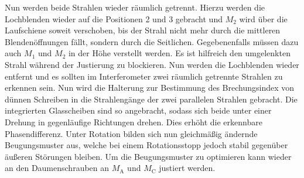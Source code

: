   Nun werden beide Strahlen wieder räumlich getrennt.
  Hierzu werden die Lochblenden wieder auf die Positionen 2 und 3 gebracht und $M_\text{2}$ wird über die Laufschiene soweit verschoben, bis der Strahl nicht mehr durch die mittleren Blendenöffnungen fällt, sondern durch die Seitlichen. Gegebenenfalls müssen dazu auch $M_\text{1}$ und $M_\text{2}$ in der Höhe verstellt werden. Es ist hilfreich den umgelenkten Strahl während der Justierung zu blockieren.
Nun werden die Lochblenden wieder entfernt und es sollten im Interferometer zwei räumlich getrennte Strahlen zu erkennen sein.
Nun wird die Halterung zur Bestimmung des Brechungsindex von dünnen Schreiben in die Strahlengänge der zwei parallelen Strahlen gebracht. Die integrierten Glasscheiben sind so angebracht, sodass sich beide unter einer Drehung in gegenläufige Richtungen drehen. Dies erhöht die erkennbare Phasendifferenz. Unter Rotation bilden sich nun gleichmäßig ändernde Beugungsmuster aus, welche bei einem Rotationsstopp jedoch stabil gegenüber äußeren Störungen bleiben.
Um die Beugungsmuster zu optimieren kann wieder an den Daumenschrauben an $M_\text{A}$ und $M_\text{C}$ justiert werden.

 
